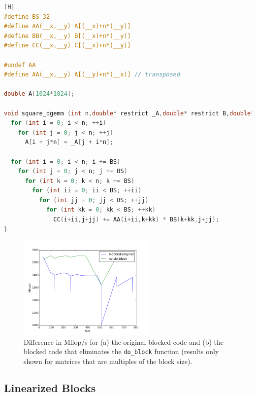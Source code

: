 \documentclass[10pt]{article}
\begin{document}
\begin{lstlisting}[language=C, basicstyle=\small][H]
#define BS 32
#define AA(__x,__y) A[(__x)+n*(__y)]
#define BB(__x,__y) B[(__x)+n*(__y)]
#define CC(__x,__y) C[(__x)+n*(__y)]

#undef AA
#define AA(__x,__y) A[(__y)+n*(__x)] // transposed

double A[1024*1024];

void square_dgemm (int n,double* restrict _A,double* restrict B,double* restrict C){
  for (int i = 0; i < n; ++i)
    for (int j = 0; j < n; ++j)
      A[i + j*n] = _A[j + i*n];

  for (int i = 0; i < n; i += BS)
    for (int j = 0; j < n; j += BS)
      for (int k = 0; k < n; k += BS)
        for (int ii = 0; ii < BS; ++ii)
          for (int jj = 0; jj < BS; ++jj)
            for (int kk = 0; kk < BS; ++kk)
              CC(i+ii,j+jj) += AA(i+ii,k+kk) * BB(k+kk,j+jj);
}
\end{lstlisting}

\begin{figure}[H]
\centering
\includegraphics[width=0.6\textwidth]{figures/no-do-block.png}
\caption{Difference in Mflop/s for (a) the original blocked code and (b) the blocked code that eliminates the {\tt do\_block} function (results only shown for matrices that are multiples of the block size).}
\label{fig:8}
\end{figure}

\subsection{Linearized Blocks}
\label{sec:LinearizedBlocks}
\end{document}
